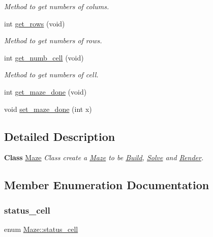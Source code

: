 \begin{DoxyCompactItemize}
\begin{DoxyCompactList}\small\item\em Method to get numbers of colums. \end{DoxyCompactList}\item 
int \hyperlink{classMaze_ac786606a34632b2254b2d27d5f5f0f3f}{get\+\_\+rows} (void)
\begin{DoxyCompactList}\small\item\em Method to get numbers of rows. \end{DoxyCompactList}\item 
int \hyperlink{classMaze_a90f5c1c140a9991942204d4a7fec3bf8}{get\+\_\+numb\+\_\+cell} (void)
\begin{DoxyCompactList}\small\item\em Method to get numbers of cell. \end{DoxyCompactList}\item 
int \hyperlink{classMaze_a152979999dd4c75014d65bf6deb5a00c}{get\+\_\+maze\+\_\+done} (void)
\item 
void \hyperlink{classMaze_ab31ce10f6d3dfdd64d15c7b48f93ed63}{set\+\_\+maze\+\_\+done} (int x)
\end{DoxyCompactItemize}


\subsection{Detailed Description}
{\bfseries Class} \hyperlink{classMaze}{Maze} {\itshape Class create a \hyperlink{classMaze}{Maze} to be \hyperlink{classBuild}{Build}, \hyperlink{classSolve}{Solve} and \hyperlink{classRender}{Render}.} 

\subsection{Member Enumeration Documentation}
\mbox{\label{classMaze_a07167e321eac2b67100fb82ecb98f1d1}} 
\subsubsection{\texorpdfstring{status\+\_\+cell}{status\_cell}}
{\footnotesize\ttfamily enum \hyperlink{classMaze_a07167e321eac2b67100fb82ecb98f1d1}{Maze\+::status\+\_\+cell}\hspace{0.3cm}{\ttfamily [strong]}}



